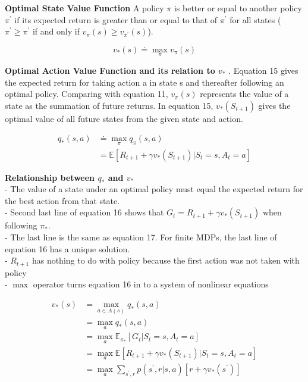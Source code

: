 \documentclass{article}
\begin{document}
\noindent
\textbf{Optimal State Value Function}
A policy $\pi$ is better or equal to another policy $\pi^{\prime}$ if its
expected return is greater than or equal to that of $\pi^{\prime}$ for all
states ($\pi^{\prime} \geq \pi^{\prime}$ if and only if $v_{\pi}(s) \geq
v_{\pi^{\prime}}(s)$). 

\begin{equation}
v_{*}(s) \doteq \max _{\pi} v_{\pi}(s)
\end{equation}

\noindent
\textbf{Optimal Action Value Function and its relation to $v_{*}$}
. Equation 15 gives the expected return for taking action a in state s and
thereafter following an optimal policy. Comparing with equation 11, $v_{\pi}(s)$
represents the value of a state as the summation of future returns. In equation
15, $v_{*}\left(S_{t+1}\right)$ gives the optimal value of all future states
from the given state and action.

\begin{equation}
\begin{aligned}
q_{*}(s, a) &\doteq \max _{\pi} q_{\pi}(s, a)\\
&= \mathbb{E}\left[R_{t+1}+\gamma v_{*}\left(S_{t+1}\right) | S_{t}=s, A_{t}=a\right]
\end{aligned}
\end{equation}

\noindent
\textbf{Relationship between $q_{*}$ and $v_{*}$}\\
- The value of a state under an optimal policy must equal the expected return
for the best action from that state. \\
- Second last line of equation 16 shows that $G_{t} = R_{t+1} + \gamma
v_{*}(S_{t+1})$ when following $\pi_{*}$. \\
- The last line is the same as equation 17. For finite MDPs, the last line of
equation 16 has a unique solution.\\
- $R_{t+1}$ has nothing to do with policy because the first action was not taken
with policy\\
- $\max$ operator turns equation 16 in to a system of nonlinear equations

\begin{equation}
\begin{aligned}
v_{*}(s) &=\max _{a \in A(s)} q_{*}(s, a)\\
&= \max _{a} q_{*}(s, a)\\
&= \max _{a} \mathbb{E}_{\pi_{*}}[G_{t} | S_{t} = s, A_{t} = a]\\
&= \max _{a} \mathbb{E}[R_{t+1} + \gamma v_{*}(S_{t+1}) | S_{t} = s, A_{t} = a]\\
&= \max _{a} \sum_{s^{\prime}, r} p(s^{\prime}, r | s, a)[r + \gamma v_{*}(s^{\prime})]
\end{aligned}
\end{equation}
\end{document}
